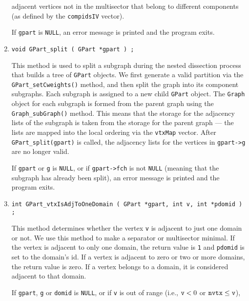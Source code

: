 \begin{enumerate}
adjacent vertices not in the multisector that belong to different
components (as defined by the {\tt compidsIV} vector).
\par {}
If {\tt gpart} is {\tt NULL},
an error message is printed and the program exits.
\item
\begin{verbatim}
void GPart_split ( GPart *gpart ) ;
\end{verbatim}
This method is used to split a subgraph during the nested
dissection process that builds a tree of {\tt GPart} objects.
We first generate a valid partition via the
{\tt GPart\_setCweights()} method,
and
then split the graph into its component subgraphs. 
Each subgraph is
assigned to a new child {\tt GPart} object.
The {\tt Graph} object for each subgraph is formed from the parent
graph using the {\tt Graph\_subGraph()} method.
This means that the storage for the adjacency lists of the subgraph 
is taken from the storage for the parent graph --- the lists are
mapped into the local ordering via the {\tt vtxMap} vector.
After {\tt GPart\_split(gpart)} is called, the adjacency lists for the
vertices in {\tt gpart->g} are no longer valid.
\par {}
If {\tt gpart} or {\tt g} is {\tt NULL},
or if {\tt gpart->fch} is not {\tt NULL}
(meaning that the subgraph has already been split),
an error message is printed and the program exits.
\item
\begin{verbatim}
int GPart_vtxIsAdjToOneDomain ( GPart *gpart, int v, int *pdomid ) ;
\end{verbatim}
This method determines whether the vertex {\tt v} is
adjacent to just one domain or not. 
We use this method to make a separator or multisector minimal.
If the vertex is adjacent to only one domain, the return value is
{\tt 1} and {\tt *pdomid} is set to the domain's id.
If a vertex is adjacent to zero or two or more domains, the return
value is zero.
If a vertex belongs to a domain, it is considered adjacent to that
domain.
\par {}
If {\tt gpart}, {\tt g} or {\tt domid} is {\tt NULL},
or if {\tt v} is out of range
(i.e., ${\tt v} < 0$ or ${\tt nvtx} \le {\tt v}$),

\end{enumerate}
